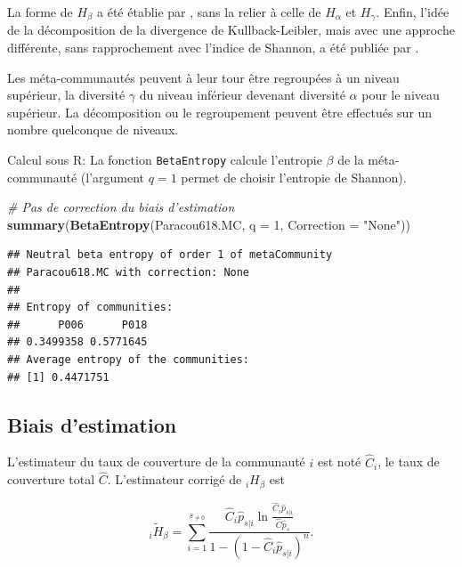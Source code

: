 \documentclass[
  11pt,
  french,
  a4paper,
  extrafontsizes,onecolumn,openright
  ]{memoir}
\newenvironment{Shaded}{\begin{snugshade}}{\end{snugshade}}
\newcommand{\CommentTok}[1]{\textcolor[rgb]{0.56,0.35,0.01}{\textit{#1}}}
\newcommand{\DataTypeTok}[1]{\textcolor[rgb]{0.13,0.29,0.53}{#1}}
\newcommand{\DecValTok}[1]{\textcolor[rgb]{0.00,0.00,0.81}{#1}}
\newcommand{\KeywordTok}[1]{\textcolor[rgb]{0.13,0.29,0.53}{\textbf{#1}}}
\newcommand{\NormalTok}[1]{#1}
\newcommand{\StringTok}[1]{\textcolor[rgb]{0.31,0.60,0.02}{#1}}
\begin{document}
La forme de \(H_{\beta}\) a été établie par \textcite{Ricotta2003a}, sans la relier à celle de \(H_{\alpha}\) et \(H_{\gamma}\).
Enfin, l'idée de la décomposition de la divergence de Kullback-Leibler, mais avec une approche différente, sans rapprochement avec l'indice de Shannon, a été publiée par \textcite{Ludovisi2006}.

Les méta-communautés peuvent à leur tour être regroupées à un niveau supérieur, la diversité \(\gamma\) du niveau inférieur devenant diversité \(\alpha\) pour le niveau supérieur.
La décomposition ou le regroupement peuvent être effectués sur un nombre quelconque de niveaux.

Calcul sous R: La fonction \texttt{BetaEntropy} calcule l'entropie \(\beta\) de la méta-communauté (l'argument \(q=1\) permet de choisir l'entropie de Shannon).

\scriptsize

\begin{Shaded}
\begin{Highlighting}[]
\CommentTok{# Pas de correction du biais d'estimation}
\KeywordTok{summary}\NormalTok{(}\KeywordTok{BetaEntropy}\NormalTok{(Paracou618.MC, }\DataTypeTok{q =} \DecValTok{1}\NormalTok{, }\DataTypeTok{Correction =} \StringTok{"None"}\NormalTok{))}
\end{Highlighting}
\end{Shaded}

\begin{verbatim}
## Neutral beta entropy of order 1 of metaCommunity 
## Paracou618.MC with correction: None 
## 
## Entropy of communities: 
##      P006      P018 
## 0.3499358 0.5771645 
## Average entropy of the communities: 
## [1] 0.4471751
\end{verbatim}

\normalsize

\hypertarget{sec-BiaisShannonBeta}{%
\subsection{Biais d'estimation}\label{sec-BiaisShannonBeta}}

L'estimateur du taux de couverture de la communauté \(i\) est noté \(\hat{C}_i\), le taux de couverture total \(\hat{C}\).
L'estimateur corrigé de \(_iH_{\beta}\) est

\begin{equation}
  \label{eq:EstHbetai}
  _{i}\tilde{H}_{\beta} = \sum^{s_{\ne 0}}_{i=1}{\frac{{\hat{C}}_i{\hat{p}}_{s|i} \ln\frac{{\hat{C}}_i{\hat{p}}_{s|i}}{\hat{C}{\hat{p}}_s}}{1-{\left(1-{\hat{C}}_i{\hat{p}}_{s|i}\right)}^n}}.
\end{equation}
\end{document}
